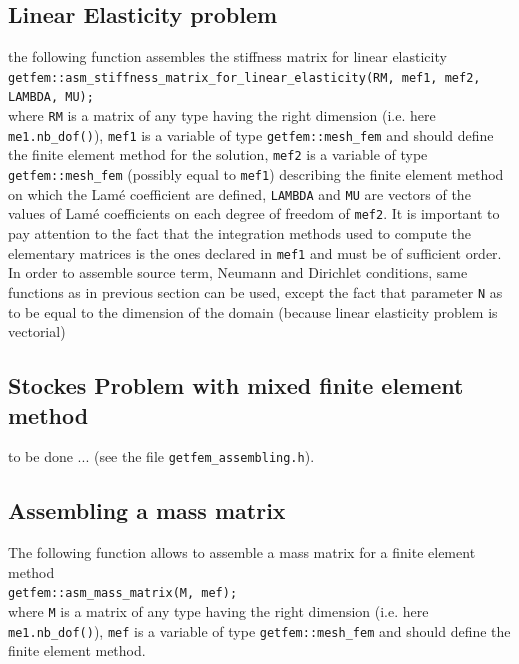 \documentclass[11pt,a4paper]{article}
\begin{document}
\subsection{Linear Elasticity problem}

the following function assembles the stiffness matrix for linear elasticity\\[0.5cm]
{\tt getfem::asm\_stiffness\_matrix\_for\_linear\_elasticity(RM, mef1, mef2, LAMBDA, MU); } \\[0.5cm]
where {\tt RM} is a matrix of any type having the right dimension (i.e. here {\tt me1.nb\_dof()}), {\tt mef1} is a variable of type {\tt getfem::mesh\_fem} and should define the finite element method for the solution, {\tt mef2}  is a variable of type {\tt getfem::mesh\_fem} (possibly equal to {\tt mef1}) describing the finite element method on which the Lam{\'e} coefficient are defined, {\tt LAMBDA} and {\tt MU} are vectors of the values of Lam{\'e} coefficients on each degree of freedom of {\tt mef2}. It is important to pay attention to the fact that the integration methods used to compute the elementary matrices is the ones declared in {\tt mef1} and must be of sufficient order.\\[0.5cm]

In order to assemble source term, Neumann and Dirichlet conditions, same functions as in previous section can be used, except the fact that parameter {\tt N} as to be equal to the dimension of the domain (because linear elasticity problem is vectorial)

\subsection{Stockes Problem with mixed finite element method}

to be done ... (see the file {\tt getfem\_assembling.h}).
 
\subsection{Assembling a mass matrix}

The following function allows to assemble a mass matrix for a finite element method\\[0.5cm]
{\tt getfem::asm_mass\_matrix(M, mef); } \\[0.5cm]
where {\tt M} is a matrix of any type having the right dimension (i.e. here {\tt me1.nb\_dof()}), {\tt mef} is a variable of type {\tt getfem::mesh\_fem} and should define the finite element method.
\end{document}
